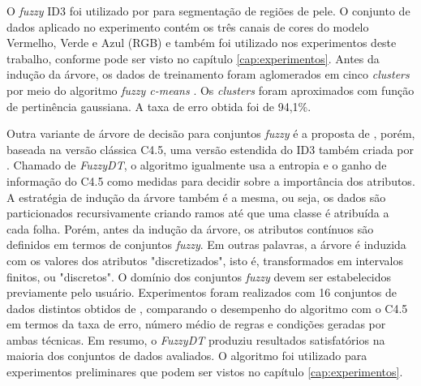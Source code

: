 O \emph{fuzzy} ID3 foi utilizado por \citet{bhatt:09} para segmentação de regiões de pele. O conjunto de dados aplicado no experimento contém os três canais de cores do modelo Vermelho, Verde e Azul (RGB) e também foi utilizado nos experimentos deste trabalho, conforme pode ser visto no capítulo \ref{cap:experimentos}. Antes da indução da árvore, os dados de treinamento foram aglomerados em cinco \emph{clusters} por meio do algoritmo \emph{fuzzy c-means} \citep{bezdek:84}. Os \emph{clusters} foram aproximados com função de pertinência gaussiana. A taxa de erro obtida foi de 94,1\%.

Outra variante de árvore de decisão para conjuntos \emph{fuzzy} é a proposta de \citet{cintra:13}, porém, baseada na versão clássica C4.5, uma versão estendida do ID3 também criada por \citet{quinlan:93}. Chamado de \emph{FuzzyDT}, o algoritmo igualmente usa a entropia e o ganho de informação do C4.5 como medidas para decidir sobre a importância dos atributos. A estratégia de indução da árvore também é a mesma, ou seja, os dados são particionados recursivamente criando ramos até que uma classe é atribuída a cada folha. Porém, antes da indução da árvore, os atributos contínuos são definidos em termos de conjuntos \emph{fuzzy}. Em outras palavras, a árvore é induzida com os valores dos atributos "discretizados", isto é, transformados em intervalos finitos, ou "discretos". O domínio dos conjuntos \emph{fuzzy} devem ser estabelecidos previamente pelo usuário. Experimentos foram realizados com 16 conjuntos de dados distintos obtidos de \citet{lichman:13}, comparando o desempenho do algoritmo com o C4.5 em termos da taxa de erro, número médio de regras e condições geradas por ambas técnicas. Em resumo, o \emph{FuzzyDT} produziu resultados satisfatórios na maioria dos conjuntos de dados avaliados. O algoritmo foi utilizado para experimentos preliminares que podem ser vistos no capítulo \ref{cap:experimentos}.

